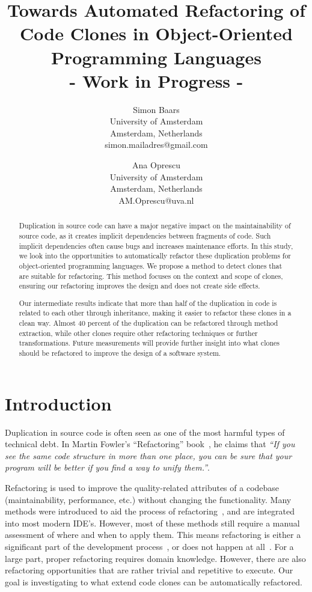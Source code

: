 \documentclass[a4paper]{article}
\title{Towards Automated Refactoring of Code Clones in Object-Oriented Programming Languages\\- Work in Progress -}
\author{
Simon Baars \\ University of Amsterdam\\
                Amsterdam, Netherlands \\ simon.mailadres@gmail.com
\and
Ana Oprescu \\ University of Amsterdam\\
                Amsterdam, Netherlands \\
                AM.Oprescu@uva.nl
}
\begin{document}
\maketitle

\begin{abstract}
Duplication in source code can have a major negative impact on the maintainability of source code, as it creates implicit dependencies between fragments of code. Such implicit dependencies often cause bugs and increases maintenance efforts. In this study, we look into the opportunities to automatically refactor these duplication problems for object-oriented programming languages. We propose a method to detect clones that are suitable for refactoring. This method focuses on the context and scope of clones, ensuring our refactoring improves the design and does not create side effects.

Our intermediate results indicate that more than half of the duplication in code is related to each other through inheritance, making it easier to refactor these clones in a clean way. Almost 40 percent of the duplication can be refactored through method extraction, while other clones require other refactoring techniques or further transformations. Future measurements will provide further insight into what clones should be refactored to improve the design of a software system.
\end{abstract}

\section{Introduction}
Duplication in source code is often seen as one of the most harmful types of technical debt. In Martin Fowler's ``Refactoring'' book~\cite{fowler1999refactoring}, he claims that \textit{``If you see the same code structure in more than one place, you can be sure that your program will be better if you find a way to unify them.''}.

Refactoring is used to improve the quality-related attributes of a codebase (maintainability, performance, etc.) without changing the functionality. Many methods were introduced to aid the process of refactoring~\cite{fowler1999refactoring, wake2004refactoring}, and are integrated into most modern IDE's. However, most of these methods still require a manual assessment of where and when to apply them. This means refactoring is either a significant part of the development process~\cite{lientz1978characteristics, mens2004survey}, or does not happen at all~\cite{mens2003refactoring}. For a large part, proper refactoring requires domain knowledge. However, there are also refactoring opportunities that are rather trivial and repetitive to execute. Our goal is investigating to what extend code clones can be automatically refactored.
\end{document}

